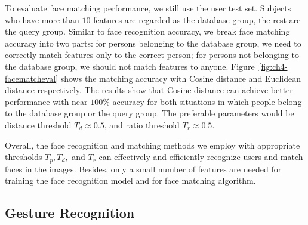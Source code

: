 To evaluate face matching performance, we still use the user test set. Subjects who have more than $10$ features are regarded as the database group, the rest are the query group. Similar to face recognition accuracy, we break face matching accuracy into two parts: for persons belonging to the database group, we need to correctly match features only to the correct person; for persons not belonging to the database group, we should not match features to anyone. Figure~\ref{fig:ch4-facematcheval} shows the matching accuracy with Cosine distance and Euclidean distance respectively. The results show that Cosine distance can achieve better performance with near $100\%$ accuracy for both situations in which people belong to the database group or the query group. The preferable parameters would be distance threshold $T_d \approx 0.5$, and ratio threshold $T_r \approx 0.5$.

Overall, the face recognition and matching methods we employ with appropriate thresholds $T_p, T_d,$ and $T_r$ can effectively and efficiently recognize users and match faces in the images. Besides, only a small number of features are needed for training the face recognition model and for face matching algorithm.

\subsection{Gesture Recognition}

